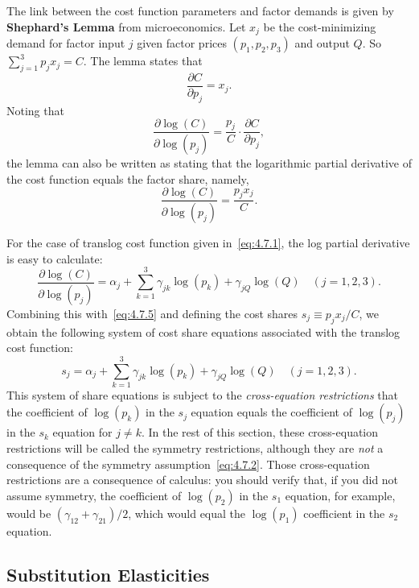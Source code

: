 The link between the cost function parameters and factor demands is given by
\textbf{Shephard's Lemma} from microeconomics. Let $x_j$ be the cost-minimizing demand
for factor input $j$ given factor prices $(p_1, p_2, p_3)$ and output $Q$.
So $\sum_{j=1}^{3} p_j x_j = C$. The lemma states that
\begin{equation}
\frac{\partial C}{\partial p_j} = x_j.
\label{eq:4.7.4}
\end{equation}
Noting that
\[
\frac{\partial \log(C)}{\partial \log(p_j)}
= \frac{p_j}{C} \cdot \frac{\partial C}{\partial p_j},
\]
the lemma can also be written as stating that the logarithmic partial derivative of
the cost function equals the factor share, namely,
\begin{equation}
\frac{\partial \log(C)}{\partial \log(p_j)} = \frac{p_j x_j}{C}.
\label{eq:4.7.5}
\end{equation}

For the case of translog cost function given in~\eqref{eq:4.7.1}, the log partial
derivative is easy to calculate:
\begin{equation}
\frac{\partial \log(C)}{\partial \log(p_j)}
= \alpha_j + \sum_{k=1}^{3} \gamma_{jk} \log(p_k) + \gamma_{jQ} \log(Q)
\quad (j = 1, 2, 3).
\label{eq:4.7.6}
\end{equation}
Combining this with~\eqref{eq:4.7.5} and defining the cost shares
$s_j \equiv p_j x_j / C$, we obtain the following system of cost share equations
associated with the translog cost function:
\begin{equation}
s_j = \alpha_j + \sum_{k=1}^{3} \gamma_{jk} \log(p_k) + \gamma_{jQ} \log(Q)
\quad (j = 1, 2, 3).
\label{eq:4.7.7}
\end{equation}
This system of share equations is subject to the \textit{cross-equation restrictions}
that the coefficient of $\log(p_k)$ in the $s_j$ equation equals the coefficient of
$\log(p_j)$ in the $s_k$ equation for $j \neq k$. In the rest of this section, these
cross-equation restrictions will be called the symmetry restrictions, although they
are \textit{not} a consequence of the symmetry assumption~\eqref{eq:4.7.2}.
Those cross-equation restrictions are a consequence of calculus: you should verify
that, if you did not assume symmetry, the coefficient of $\log(p_2)$ in the $s_1$
equation, for example, would be $(\gamma_{12} + \gamma_{21})/2$, which would
equal the $\log(p_1)$ coefficient in the $s_2$ equation.

\subsection*{Substitution Elasticities}

